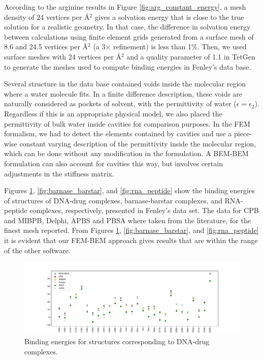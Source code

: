 According to the arginine results in Figure \ref{fig:arg_constant_energy}, a mesh density of 24 vertices per \AA$^2$ gives a solvation energy that is close to the true solution for a realistic geometry. 
In that case, the difference in solvation energy between calculations using finite element grids generated from a surface mesh of 8.6 and 24.5 vertices per \AA$^2$ (a 3$\times$ refinement) is less than 1\%.
Then, we used surface meshes with 24 vertices per \AA$^2$ and a quality parameter of 1.1 in TetGen to generate the meshes used to compute binding energies in Fenley's data base. 

Several structure in the data base contained voids inside the molecular region where a water molecule fits. 
In a finite difference description, these voids are naturally considered as pockets of solvent, with the permittivity of water ($\epsilon=\epsilon_2$).
Regardless if this is an appropriate physical model, we also placed the permittivity of bulk water inside cavities for comparison purposes.
In the FEM formalism, we had to detect the elements contained by cavities and use a piece-wise constant varying description of the permittivity inside the molecular region, which can be done without any modification in the formulation. 
A BEM-BEM formulation can also account for cavities this way,\cite{AltmanBardhanWhiteTidor09,CooperBardhanBarba2014} but involves certain adjustments in the stiffness matrix.

Figures \ref{fig:dna_drug}, \ref{fig:barnase_barstar}, and \ref{fig:rna_peptide} show the binding energies of structures of DNA-drug complexes, barnase-barstar complexes, and RNA-peptide complexes, respectively, presented in Fenley's data set.\cite{HarrisBoschitcshFenley2013} The data for CPB\cite{HarrisBoschitcshFenley2013} and MIBPB, Delphi, APBS and PBSA where taken from the literature,\cite{nguyen2017accurate} for the finest mesh reported. 
From Figures \ref{fig:dna_drug}, \ref{fig:barnase_barstar}, and \ref{fig:rna_peptide} it is evident that our FEM-BEM approach gives results that are within the range of the other software.

\begin{figure}
\centering
\includegraphics[width=\textwidth]{binding_energy_dna-drug.pdf}
\caption{Binding energies for structures corresponding to DNA-drug complexes.}
\label{fig:dna_drug}
\end{figure}


